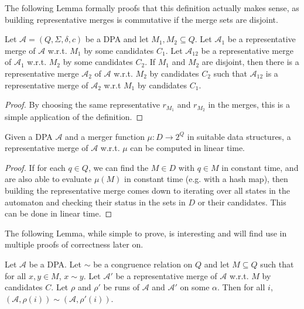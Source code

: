 The following Lemma formally proofs that this definition actually makes sense, as building representative merges is commutative if the merge sets are disjoint.

\begin{lem}
	Let $\mathcal{A} = (Q, \Sigma, \delta, c)$ be a DPA and let $M_1, M_2 \subseteq Q$. Let $\mathcal{A}_1$ be a representative merge of $\mathcal{A}$ w.r.t. $M_1$ by some candidates $C_1$. Let $\mathcal{A}_{12}$ be a representative merge of $\mathcal{A}_1$ w.r.t. $M_2$ by some candidates $C_2$. If $M_1$ and $M_2$ are disjoint, then there is a representative merge $\mathcal{A}_2$ of $\mathcal{A}$ w.r.t. $M_2$ by candidates $C_2$ such that $\mathcal{A}_{12}$ is a representative merge of $\mathcal{A}_2$ w.r.t $M_1$ by candidates $C_1$.
\end{lem}

\begin{proof}
	By choosing the same representative $r_{M_1}$ and $r_{M_2}$ in the merges, this is a simple application of the definition.
\end{proof}

\begin{lem}
	Given a DPA $\mathcal{A}$ and a merger function $\mu : D \rightarrow 2^Q$ in suitable data structures, a representative merge of $\mathcal{A}$ w.r.t. $\mu$ can be computed in linear time.
	\label{lem:general:repmerge_lintime}
\end{lem}

\begin{proof}
	If for each $q \in Q$, we can find the $M \in D$ with $q \in M$ in constant time, and are also able to evaluate $\mu(M)$ in constant time (e.g. with a hash map), then building the representative merge comes down to iterating over all states in the automaton and checking their status in the sets in $D$ or their candidates. This can be done in linear time.
\end{proof}

\vspace{10pt}

The following Lemma, while simple to prove, is interesting and will find use in multiple proofs of correctness later on.

\begin{lem}
	Let $\mathcal{A}$ be a DPA. Let $\sim$ be a congruence relation on $Q$ and let $M \subseteq Q$ such that for all $x, y \in M$, $x \sim y$. Let $\mathcal{A}'$ be a representative merge of $\mathcal{A}$ w.r.t. $M$ by candidates $C$. Let $\rho$ and $\rho'$ be runs of $\mathcal{A}$ and $\mathcal{A}'$ on some $\alpha$. Then for all $i$, $(\mathcal{A}, \rho(i)) \sim (\mathcal{A}, \rho'(i))$.
	\label{lem:general:cong_stays_in_merge}
\end{lem}


